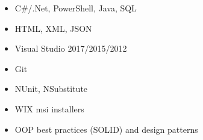 \begin{multicols}{2}
	\begin{itemize}
		\item C\#/.Net, PowerShell, Java, SQL
		\item HTML, XML, JSON
		\item Visual Studio 2017/2015/2012
		\item Git
		\item NUnit, NSubstitute
		\item WIX msi installers
		\item OOP best practices (SOLID) and design patterns
	\end{itemize}
	\vspace*{\fill}
\end{multicols}